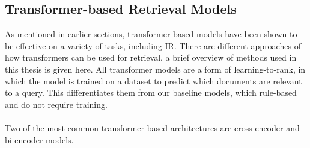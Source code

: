 \subsection{Transformer-based Retrieval Models}\label{sec:transformer-retrieval-models}
As mentioned in earlier sections, transformer-based models have been shown to be effective on a variety of tasks, including IR.
There are different approaches of how transformers can be used for retrieval, a brief overview of methods used in this thesis is given here.
All transformer models are a form of learning-to-rank, in which the model is trained on a dataset to predict which documents are relevant to a query.
This differentiates them from our baseline models, which rule-based and do not require training.
\\\\
Two of the most common transformer based architectures are cross-encoder and bi-encoder models.
